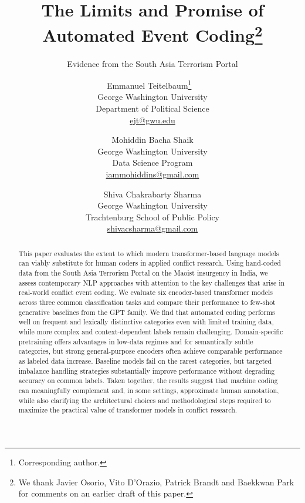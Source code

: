 \documentclass[
  11pt,
]{article}
\title{The Limits and Promise of Automated Event Coding\thanks{We thank
Javier Osorio, Vito D'Orazio, Patrick Brandt and Baekkwan Park for
comments on an earlier draft of this paper.}}
\subtitle{Evidence from the South Asia Terrorism Portal}
\author{Emmanuel Teitelbaum\thanks{Corresponding author.}
~\orcidlink{0000-0001-7089-0588}
\\George Washington University
\\Department of Political Science
\\\href{mailto:ejt@gwu.edu}{ejt@gwu.edu}
 \and Mohiddin Bacha Shaik
\\George Washington University
\\Data Science Program
\\\href{mailto:iammohiddins@gmail.com}{iammohiddins@gmail.com}
 \and Shiva Chakrabarty Sharma
\\George Washington University
\\Trachtenburg School of Public Policy
\\\href{mailto:shivacsharma@gmail.com}{shivacsharma@gmail.com}
 }
\date{}  %
\newcommand{\published}[1]{%
   \gdef\puB{#1}}
\newcommand{\puB}{}
\begin{document}


\published{\textbf{2026-01-31} \qquad Prepared for the GWU Comparative
Politics Workshop. \\ {\scriptsize Access the code, data, and analysis
at \url{https://github.com/eteitelbaum/code-satp.git}}}

\vspace{0.25in}

\maketitle

\vspace{0.25in}


\begin{abstract}
\noindent            %
This paper evaluates the extent to which modern transformer-based
language models can viably substitute for human coders in applied
conflict research. Using hand-coded data from the South Asia Terrorism
Portal on the Maoist insurgency in India, we assess contemporary NLP
approaches with attention to the key challenges that arise in real-world
conflict event coding. We evaluate six encoder-based transformer models
across three common classification tasks and compare their performance
to few-shot generative baselines from the GPT family. We find that
automated coding performs well on frequent and lexically distinctive
categories even with limited training data, while more complex and
context-dependent labels remain challenging. Domain-specific pretraining
offers advantages in low-data regimes and for semantically subtle
categories, but strong general-purpose encoders often achieve comparable
performance as labeled data increase. Baseline models fail on the rarest
categories, but targeted imbalance handling strategies substantially
improve performance without degrading accuracy on common labels. Taken
together, the results suggest that machine coding can meaningfully
complement and, in some settings, approximate human annotation, while
also clarifying the architectural choices and methodological steps
required to maximize the practical value of transformer models in
conflict research.
\end{abstract}

\vspace{\baselineskip}
\end{document}
